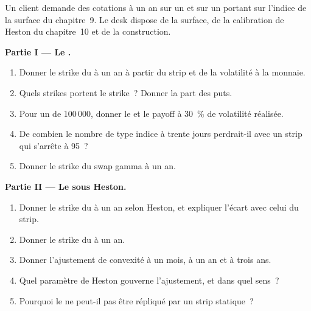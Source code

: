 \begin{problem}\label{pb:dv:variance-swaps-and-volatility-derivatives:1}
Un client demande des cotations à un an sur un  et sur un  portant sur l'indice de la surface du
chapitre~9. Le desk dispose de la surface, de la calibration de Heston du chapitre~10 et de la construction.

\medskip\noindent\textbf{Partie I --- Le .}
\begin{enumerate}
\item Donner le strike du  à un an à partir du strip et de la volatilité à la monnaie.
\item Quels strikes portent le strike~? Donner la part des puts.
\item Pour un  de 100\,000, donner le  et le payoff à 30~\% de volatilité réalisée.
\item De combien le nombre de type indice à trente jours perdrait-il avec un strip qui s'arrête à 95~?
\item Donner le strike du swap gamma à un an.
\end{enumerate}

\medskip\noindent\textbf{Partie II --- Le  sous Heston.}
\begin{enumerate}[resume]
\item Donner le strike du  à un an selon Heston, et expliquer l'écart avec celui du strip.
\item Donner le strike du  à un an.
\item Donner l'ajustement de convexité à un mois, à un an et à trois ans.
\item Quel paramètre de Heston gouverne l'ajustement, et dans quel sens~?
\item Pourquoi le  ne peut-il pas être répliqué par un strip statique~?
\end{enumerate}


\end{problem}
